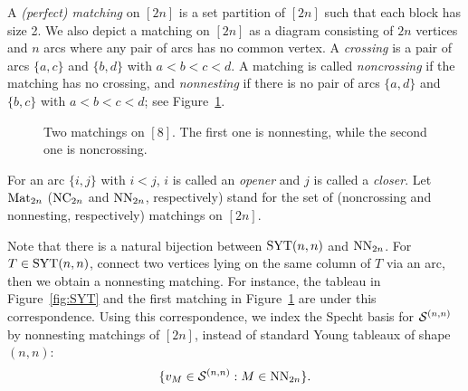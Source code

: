 A \emph{(perfect) matching} on \( [2n] \) is a set partition of \( [2n] \) such that
each block has size 2.
We also depict a matching on \( [2n] \) as a diagram consisting of \( 2n \)
vertices and \( n \) arcs where any pair of arcs has no common vertex.
A \emph{crossing} is a pair of arcs \( \{a,c\} \) and \( \{b,d\} \)
with \( a<b<c<d \).
A matching is called \emph{noncrossing} if the matching has no crossing,
and \emph{nonnesting} if there is no pair of arcs \( \{a,d\} \)
and \( \{b,c\} \) with \( a<b<c<d \); see Figure~\ref{fig:matching}.
\begin{figure}
   \qquad
  \caption{Two matchings on \( [8] \). The first one is nonnesting, while the second one is noncrossing.}
  \label{fig:matching}
\end{figure}
For an arc \( \{i,j\} \) with \( i<j \), $i$ is called an
\emph{opener} and $j$ is called a \emph{closer}. 
Let \( \operatorname{Mat}_{2n} \) (\( \operatorname{NC}_{2n} \) and \( \operatorname{NN}_{2n} \), respectively) stand for
the set of (noncrossing and nonnesting, respectively) matchings on \( [2n] \).

Note that there is a natural bijection between \( \operatorname{SYT}(n,n) \) and
\( \operatorname{NN}_{2n} \). For \( T\in\operatorname{SYT}(n,n) \), connect two vertices lying
on the same column of \( T \) via an arc, then we obtain a
nonnesting matching. For instance, the tableau in Figure~\ref{fig:SYT}
and the first matching in Figure~\ref{fig:matching} are under this correspondence.
Using this correspondence, we index the Specht basis for \( \mathcal{S}^{(n,n)} \)
by nonnesting matchings of \( [2n] \), instead of standard Young tableaux of shape
\( (n,n) \):
\[
  \{ v_M \in \mathcal{S}^{(n,n)} : M\in\operatorname{NN}_{2n} \}.
\]

